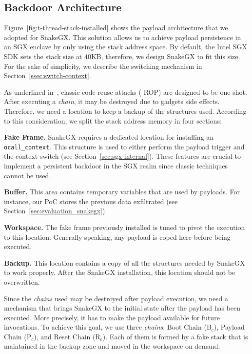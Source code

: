 \subsection{Backdoor Architecture}
\label{ssec:enclave-kit-architecture}

Figure~\ref{fig:t-thread-stack-installed} shows the payload
architecture that we adopted for SnakeGX.
This solution allows us to achieve payload persistence in an SGX enclave by 
only using the stack address space.
By default, the Intel SGX SDK sets the stack size at $40$KB, therefore, we 
design SnakeGX to fit this size.
For the sake of simplicity, we describe the switching mechanism in 
Section~\ref{ssec:switch-context}.

As underlined in~\cite{vogl2014persistent}, classic code-reuse attacks (\eg 
ROP) are designed to be one-shot.
After executing a \emph{chain}, it may be destroyed due to gadgets side effects.
Therefore, we need a location to keep a backup of the structures used.
According to this consideration, we split the stack address memory in four 
sections:

\textbf{Fake Frame.} SnakeGX requires a dedicated location for installing 
an \texttt{ocall\_context}.
This structure is used to either perform the payload trigger and the 
context-switch (see Section~\ref{sec:sgx-internal}).
These features are crucial to implement a persistent backdoor in the SGX 
realm since classic techniques cannot be used.

\textbf{Buffer.} This area contains temporary variables that are used by  
payloads. For instance, our PoC stores the previous data 
exfiltrated (see Section~\ref{sec:evaluation_snakegx}).

\textbf{Workspace.} The fake frame previously installed is tuned to pivot the 
execution to this location. 
Generally speaking, any payload is coped here before being executed.

\textbf{Backup.} This location contains a copy of all the structures 
needed by SnakeGX to work properly.
After the SnakeGX installation, this location should not be overwritten.

Since the \emph{chains} used may be destroyed after 
payload execution, we need a mechanism that brings SnakeGX to the initial 
state after the payload has been executed.
More precisely, it has to make the payload available for future invocations.
To achieve this goal, we use three \emph{chains}: Boot Chain (B$_c$), Payload 
Chain (P$_c$), and Reset Chain (R$_c$).
Each of them is formed by a fake stack that is maintained in the backup zone 
and moved in the workspace on demand:


